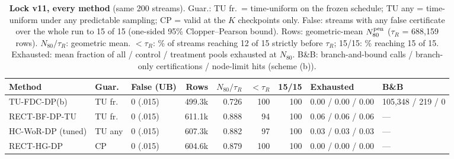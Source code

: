 \begin{table}[t]
\caption{\textbf{Lock v11, every method} (same 200 streams). Guar.: TU fr.\ = time-uniform on the frozen schedule; TU any = time-uniform under any predictable sampling; CP = valid at the $K$ checkpoints only. False: streams with any false certificate over the whole run to 15 of 15 (one-sided 95\% Clopper--Pearson bound). Rows: geometric-mean $N_{80}^{\text{pen}}$ ($\tau_R$ = 688,159 rows). $N_{80}/\tau_R$: geometric mean. $<\tau_R$: \% of streams reaching 12 of 15 strictly before $\tau_R$; 15/15: \% reaching 15 of 15. Exhausted: mean fraction of all / control / treatment pools exhausted at $N_{80}$. B\&B: branch-and-bound calls / branch-only certifications / node-limit hits (scheme (b)).}
\label{tab:v11methods}
\small
\setlength{\tabcolsep}{3.5pt}
\begin{tabular}{@{}lllrrrrll@{}}
\toprule
Method & Guar. & False (UB) & Rows & $N_{80}/\tau_R$ & $<\tau_R$ & 15/15 & Exhausted & B\&B \\
\midrule
TU-FDC-DP(b) & TU fr. & 0 (.015) & 499.3k & 0.726 & 100 & 100 & 0.00 / 0.00 / 0.00 & 105,348 / 219 / 0 \\
RECT-BF-DP-TU & TU fr. & 0 (.015) & 611.1k & 0.888 & 94 & 100 & 0.06 / 0.06 / 0.06 & --- \\
HC-WoR-DP (tuned) & TU any & 0 (.015) & 607.3k & 0.882 & 97 & 100 & 0.03 / 0.03 / 0.03 & --- \\
RECT-HG-DP & CP & 0 (.015) & 604.6k & 0.879 & 100 & 100 & 0.00 / 0.00 / 0.00 & --- \\
\bottomrule
\end{tabular}
\end{table}
